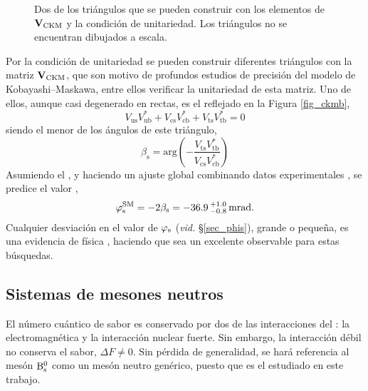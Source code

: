 \begin{figure}[H]
\centering
{} \hfill
{} \hfill
%
\caption{Dos de los triángulos que se pueden construir con los elementos de $\mathbf{V}_{\text{CKM}}$ y la condición de unitariedad. Los triángulos no se encuentran dibujados a escala.}	
\end{figure}


Por la condición de unitariedad se pueden construir diferentes triángulos con la matriz $\mathbf{V}_{\text{CKM}}$, que son motivo de profundos estudios de precisión del modelo de Kobayashi--Maskawa, entre ellos verificar la unitariedad de esta matriz. Uno de ellos, aunque casi degenerado en rectas, es el reflejado en la Figura \ref{fig_ckmb},
\begin{equation}
 V_{\mathrm{us}} V_{\mathrm{ub}}^* + V_{\mathrm{cs}} V_{\mathrm{cb}}^* + V_{\mathrm{ts}} V_{\mathrm{tb}}^* = 0 
\end{equation}
siendo el menor de los ángulos de este triángulo,
\begin{equation}
	\beta_{\mathrm{s}} =  \text{arg} \left( - \frac{V_{\mathrm{ts}} V_{\mathrm{tb}}^*}{V_{\mathrm{cs}} V_{\mathrm{cb}}^*}   \right)  \label{eq_bs_ckm}
\end{equation}
\color{vero} Asumiendo el \stdmod, y haciendo un ajuste global combinando datos experimentales \cite{ckmfitter1}, se predice el valor  , %
\begin{equation}
	\varphi_{\text{s}}^{\text{SM}} = -2 \beta_{\text{s}} = -36.9\,{}_{-0.8}^{+1.0} \, \text{mrad}. \label{eq_smpredicphis}
\end{equation} \color{norm}
\color{dieg} Cualquier desviación en el valor de $\varphi_{\text{s}}$ (\emph{vid.} \S\ref{sec_phis}), grande o pequeña, es una evidencia de física \bstdmod, haciendo que  sea un excelente observable para estas búsquedas. \color{norm}

\subsection{Sistemas de mesones neutros} %
\label{sec_neutralmesons}

El número cuántico de sabor es conservado por dos de las interacciones del \stdmod: la electromagnética y la interacción nuclear fuerte. Sin embargo, la interacción débil no conserva el sabor, $\Delta F \neq 0$. Sin pérdida de generalidad, se hará referencia al mesón $\text{B}{}_{\text{s}}^{\text{0}}$ como un mesón neutro genérico, puesto que es el \color{vero}estudiado \color{norm} en este trabajo. 

